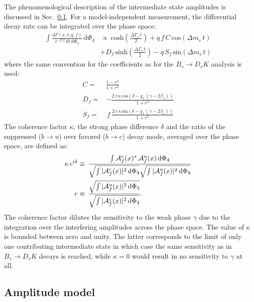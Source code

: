The phenomenological description of the intermediate state amplitudes is discussed in Sec.~\ref{ssec:ampModel}.
For a model-independent measurement, the differential decay rate can be integrated over the phase space:
\begin{align}
\label{eq:PDF_intX}
	\nonumber
	\int \frac{\text{d}\Gamma(x,t,q,f)}{e^{- \Gamma_s t} \, \text{d}t \,  \text{d}\Phi_4}  \, \text{d}\Phi_4 &\propto    
	\, \text{cosh} \left( \frac{\Delta \Gamma_s \, t}{2}\right) 
	  + q \, f \, C \, \text{cos} \left( \Delta m_s \, t \right)   \\
	 & +  D_{f} \, \text{sinh} \left( \frac{\Delta \Gamma_s \, t}{2}\right)  
	  - q  \, S_{f}\, \text{sin} \left(\Delta m_s \, t \right)  
\end{align}
where the same convention for the \CP coefficients as for the $B_s \to D_s K$ analysis is used:
\begin{align}
\label{eq:CPcoeff}
	C= & \frac{1-r^2}{1+r^2}   \\
	D_{f} = &  -\frac{2 \, r \, \kappa \, \text{cos}\left(\delta-q_f \, (\gamma-2\beta_s)\right)}{1+r^2}   \\
	S_{f} = & \,  f \, \frac{2 \, r \, \kappa \, \text{sin}\left(\delta-q_f \, (\gamma-2\beta_s)\right)}{1+r^2}   
\end{align}
The coherence factor $\kappa$, the strong phase difference $\delta$ and the ratio of the suppressed ($b\to u$) over favored ($b\to c$) decay mode, averaged over the 
phase space, are defined as:
\begin{align}
\label{eq:coherenceFactor}
	\kappa \, e^{i\delta} &\equiv \, \frac{\int \mathcal A^c_f(x)^{*} \, \mathcal A^u_f(x)  \, \mathrm{d}\Phi_4}{\sqrt{\int \vert \mathcal A^c_f(x) \vert^2 \, \mathrm{d}\Phi_4} \sqrt{\int \vert \mathcal A^u_f(x) \vert^2 \, \mathrm{d}\Phi_4}  } \\
	r &\equiv \, \frac{\sqrt{\int \vert \mathcal A^u_f(x)\vert^2 \, \mathrm{d}\Phi_4 }}{\sqrt{\int \vert \mathcal A^c_f(x)\vert^2 \, \mathrm{d}\Phi_4}} .
\end{align}
The coherence factor dilutes the sensitivity to the weak phase $\gamma$ due to the integration over the interfering amplitudes across the phase space.
The value of $\kappa$ is bounded between zero and unity.
The latter corresponds to the limit of only one contributing intermediate state in which case the same sensitivity as in $B_s \to D_s K$ decays is reached, 
while $\kappa = 0$ would result in no sensitivity to $\gamma$ at all.

\clearpage
\subsection{Amplitude model}
\label{ssec:ampModel}


